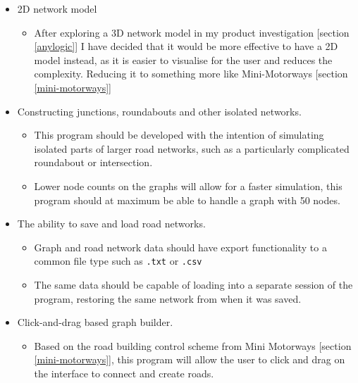     \begin{itemize}
        \item 2D network model
        \begin{itemize}
            \item After exploring a 3D network model in my product investigation [section \ref{anylogic}] I have decided that it would be more effective to have a 2D model instead, as it is easier to visualise for the user and reduces the complexity. Reducing it to something more like Mini-Motorways [section \ref{mini-motorways}]
        \end{itemize}
        \item Constructing junctions, roundabouts and other isolated networks.
        \begin{itemize}
            \item This program should be developed with the intention of simulating isolated parts of larger road networks, such as a particularly complicated roundabout or intersection.
            \item Lower node counts on the graphs will allow for a faster simulation, this program should at maximum be able to handle a graph with 50 nodes.
        \end{itemize}
        \item The ability to save and load road networks.
        \begin{itemize}
            \item Graph and road network data should have export functionality to a common file type such as \texttt{.txt} or \texttt{.csv}
            \item The same data should be capable of loading into a separate session of the program, restoring the same network from when it was saved.
        \end{itemize}
        \item Click-and-drag based graph builder.
        \begin{itemize}
            \item Based on the road building control scheme from Mini Motorways [section \ref{mini-motorways}], this program will allow the user to click and drag on the interface to connect and create roads.
        \end{itemize}
    \end{itemize}

